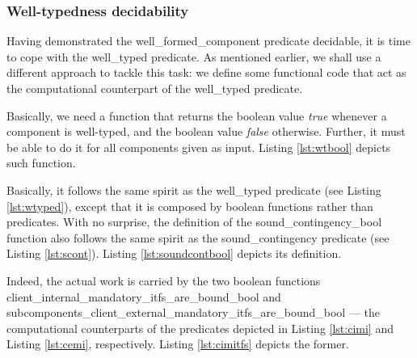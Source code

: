 	
	
\subsubsection{Well-typedness decidability}


	Having demonstrated the \textsf{well\_formed\_component} predicate decidable, it is time to cope
	with the \textsf{well\_typed} predicate. As mentioned earlier, we shall use a different approach
	to tackle this task: we define some functional code that act as the computational counterpart of the \textsf{well\_typed}
	predicate.
		
			Basically, we need a function that returns the boolean value \textit{true} whenever
		a \textsf{component} is well-typed, and the boolean value \textit{false} otherwise. Further, it must be able
		to do it for all \textsf{component}s given as input. Listing \ref{lst:wtbool} depicts such function.

		
			
	
			
	\noindent Basically, it follows the same spirit as the \textsf{well\_typed} predicate (see Listing \ref{lst:wtyped}),
	except that it is composed by boolean functions rather than predicates. With no surprise, the definition
	of the \textsf{sound\_contingency\_bool} function also follows the same spirit as the \textsf{sound\_contingency}
	predicate (see Listing \ref{lst:scont}). Listing \ref{lst:soundcontbool} depicts its definition.	
	
		
	
	
	\noindent Indeed, the actual work is carried by the two boolean functions
	\textsf{client\_internal\_mandatory\_itfs\_are\_bound\_bool} and 
	\textsf{subcomponents\_client\_external\_mandatory\_itfs\_are\_bound\_bool}
	--- the computational counterparts of the predicates depicted in Listing \ref{lst:cimi} 
	and Listing \ref{lst:cemi}, respectively. Listing \ref{lst:cimitfs} depicts the former.		


	


